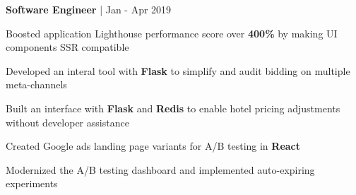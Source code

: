 \begin{cventries}
\cventry
{\textbf{Software Engineer} | \color{awesome}{Super}}
{Jan - Apr 2019} %
{ %
\begin{cvitems}
\item {Boosted application Lighthouse performance score over \textbf{400\%} by making UI components SSR compatible}
\item {Developed an interal tool with \textbf{Flask} to simplify and audit bidding on multiple meta-channels}
\item {Built an interface with \textbf{Flask} and \textbf{Redis} to enable hotel pricing adjustments without developer assistance}
\item {Created Google ads landing page variants for A/B testing in \textbf{React}}
\item {Modernized the A/B testing dashboard and implemented auto-expiring experiments}
\end{cvitems}
}






\end{cventries}
